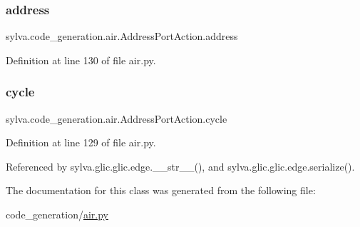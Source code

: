 \subsubsection{\texorpdfstring{address}{address}}
{\footnotesize\ttfamily sylva.\+code\+\_\+generation.\+air.\+Address\+Port\+Action.\+address}



Definition at line 130 of file air.\+py.

\mbox{\label{classsylva_1_1code__generation_1_1air_1_1_address_port_action_aa6bd7cd1cbf6cf3a36e02329a88affbf}} 
\subsubsection{\texorpdfstring{cycle}{cycle}}
{\footnotesize\ttfamily sylva.\+code\+\_\+generation.\+air.\+Address\+Port\+Action.\+cycle}



Definition at line 129 of file air.\+py.



Referenced by sylva.\+glic.\+glic.\+edge.\+\_\+\+\_\+str\+\_\+\+\_\+(), and sylva.\+glic.\+glic.\+edge.\+serialize().



The documentation for this class was generated from the following file\+:\begin{DoxyCompactItemize}
\item 
code\+\_\+generation/\hyperlink{air_8py}{air.\+py}\end{DoxyCompactItemize}
